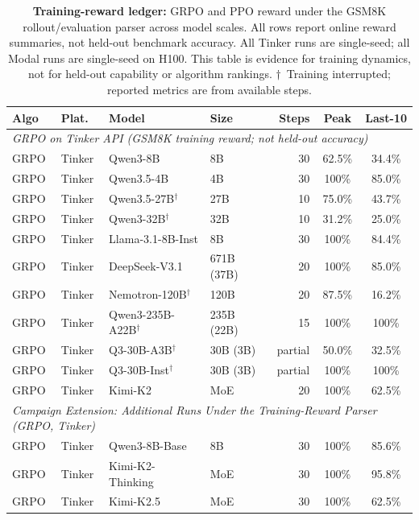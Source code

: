 \documentclass{article}
\begin{document}
\begin{table}[t]
\centering
\caption{\textbf{Training-reward ledger:} GRPO and PPO reward under the GSM8K
rollout/evaluation parser across model scales.  All rows report online reward
summaries, not held-out benchmark accuracy.  All Tinker runs are single-seed;
all Modal runs are single-seed on H100.  This table is evidence for training
dynamics, not for held-out capability or algorithm rankings.
$\dagger$~Training interrupted; reported metrics are from available steps.}
\label{tab:main_results}
\scriptsize
\setlength{\tabcolsep}{3pt}
\begin{tabular}{@{}l l l l r c c@{}}
\toprule
\textbf{Algo} & \textbf{Plat.} & \textbf{Model} & \textbf{Size} & \textbf{Steps} & \textbf{Peak} & \textbf{Last-10} \\
\midrule
\multicolumn{7}{l}{\textit{GRPO on Tinker API (GSM8K training reward; not held-out accuracy)}} \\
\midrule
GRPO & Tinker & Qwen3-8B & 8B & 30 & 62.5\% & 34.4\% \\
GRPO & Tinker & Qwen3.5-4B & 4B & 30 & 100\% & 85.0\% \\
GRPO & Tinker & Qwen3.5-27B$^\dagger$ & 27B & 10 & 75.0\% & 43.7\% \\
GRPO & Tinker & Qwen3-32B$^\dagger$ & 32B & 10 & 31.2\% & 25.0\% \\
GRPO & Tinker & Llama-3.1-8B-Inst & 8B & 30 & 100\% & 84.4\% \\
GRPO & Tinker & DeepSeek-V3.1 & 671B (37B) & 20 & 100\% & 85.0\% \\
GRPO & Tinker & Nemotron-120B$^\dagger$ & 120B & 20 & 87.5\% & 16.2\% \\
GRPO & Tinker & Qwen3-235B-A22B$^\dagger$ & 235B (22B) & 15 & 100\% & 100\% \\
GRPO & Tinker & Q3-30B-A3B$^\dagger$ & 30B (3B) & partial & 50.0\% & 32.5\% \\
GRPO & Tinker & Q3-30B-Inst$^\dagger$ & 30B (3B) & partial & 100\% & 100\% \\
GRPO & Tinker & Kimi-K2 & MoE & 20 & 100\% & 62.5\% \\
\midrule
\multicolumn{7}{l}{\textit{Campaign Extension: Additional Runs Under the Training-Reward Parser (GRPO, Tinker)}} \\
\midrule
GRPO & Tinker & Qwen3-8B-Base & 8B & 30 & 100\% & 85.6\% \\
GRPO & Tinker & Kimi-K2-Thinking & MoE & 30 & 100\% & 95.8\% \\
GRPO & Tinker & Kimi-K2.5 & MoE & 30 & 100\% & 62.5\% \\

\end{tabular}
\end{table}
\end{document}
